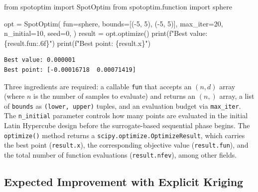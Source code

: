 \documentclass[
  twocolumn]{article}
\newenvironment{Shaded}{\begin{snugshade}}{\end{snugshade}}
\newcommand{\BuiltInTok}[1]{\textcolor[rgb]{0.00,0.23,0.31}{#1}}
\newcommand{\DecValTok}[1]{\textcolor[rgb]{0.68,0.00,0.00}{#1}}
\newcommand{\ImportTok}[1]{\textcolor[rgb]{0.00,0.46,0.62}{#1}}
\newcommand{\NormalTok}[1]{\textcolor[rgb]{0.00,0.23,0.31}{#1}}
\newcommand{\OperatorTok}[1]{\textcolor[rgb]{0.37,0.37,0.37}{#1}}
\newcommand{\SpecialCharTok}[1]{\textcolor[rgb]{0.37,0.37,0.37}{#1}}
\newcommand{\SpecialStringTok}[1]{\textcolor[rgb]{0.13,0.47,0.30}{#1}}
\begin{document}
\begin{Shaded}
\begin{Highlighting}[]
\ImportTok{from}\NormalTok{ spotoptim }\ImportTok{import}\NormalTok{ SpotOptim}
\ImportTok{from}\NormalTok{ spotoptim.function }\ImportTok{import}\NormalTok{ sphere}

\NormalTok{opt }\OperatorTok{=}\NormalTok{ SpotOptim(}
\NormalTok{    fun}\OperatorTok{=}\NormalTok{sphere,}
\NormalTok{    bounds}\OperatorTok{=}\NormalTok{[(}\OperatorTok{{-}}\DecValTok{5}\NormalTok{, }\DecValTok{5}\NormalTok{), (}\OperatorTok{{-}}\DecValTok{5}\NormalTok{, }\DecValTok{5}\NormalTok{)],}
\NormalTok{    max\_iter}\OperatorTok{=}\DecValTok{20}\NormalTok{,}
\NormalTok{    n\_initial}\OperatorTok{=}\DecValTok{10}\NormalTok{,}
\NormalTok{    seed}\OperatorTok{=}\DecValTok{0}\NormalTok{,}
\NormalTok{)}
\NormalTok{result }\OperatorTok{=}\NormalTok{ opt.optimize()}
\BuiltInTok{print}\NormalTok{(}\SpecialStringTok{f"Best value: }\SpecialCharTok{\{}\NormalTok{result}\SpecialCharTok{.}\NormalTok{fun}\SpecialCharTok{:.6f\}}\SpecialStringTok{"}\NormalTok{)}
\BuiltInTok{print}\NormalTok{(}\SpecialStringTok{f"Best point: }\SpecialCharTok{\{}\NormalTok{result}\SpecialCharTok{.}\NormalTok{x}\SpecialCharTok{\}}\SpecialStringTok{"}\NormalTok{)}
\end{Highlighting}
\end{Shaded}

\begin{verbatim}
Best value: 0.000001
Best point: [-0.00016718  0.00071419]
\end{verbatim}

Three ingredients are required: a callable \texttt{fun} that accepts an
\((n, d)\) array (where \(n\) is the number of samples to evaluate) and
returns an \((n,)\) array, a list of \texttt{bounds} as
\texttt{(lower,\ upper)} tuples, and an evaluation budget via
\texttt{max\_iter}. The \texttt{n\_initial} parameter controls how many
points are evaluated in the initial Latin Hypercube design before the
surrogate-based sequential phase begins. The \texttt{optimize()} method
returns a \texttt{scipy.optimize.OptimizeResult}, which carries the best
point (\texttt{result.x}), the corresponding objective value
(\texttt{result.fun}), and the total number of function evaluations
(\texttt{result.nfev}), among other fields.

\subsection{Expected Improvement with Explicit
Kriging}\label{expected-improvement-with-explicit-kriging}
\end{document}
